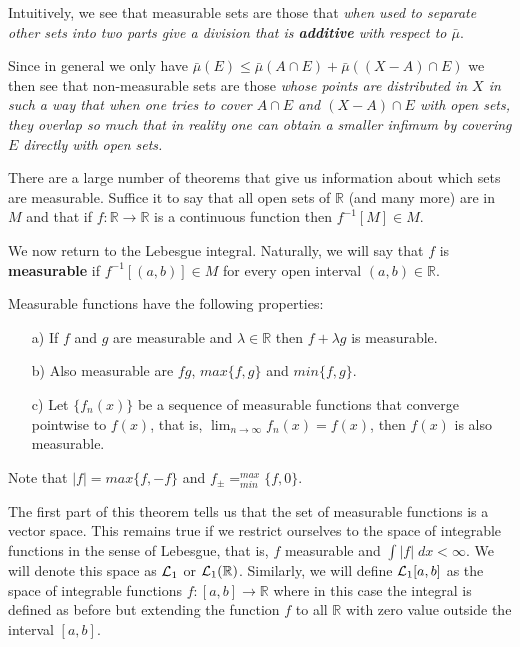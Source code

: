 Intuitively, we see that measurable sets are those that 
{\it when used to separate other sets into two parts give a
division that is {\bf additive} with respect to $\bar{\mu}$}.

Since in general we only have 
$\bar{\mu}(E) \leq \bar{\mu}(A \cap E) + \bar{\mu}((X - A) \cap E)$
we then see that non-measurable sets are those 
{\it whose points are distributed in $X$ in such a way that when
one tries to cover $A \cap E$ and $(X - A) \cap E$ with open sets, they
overlap so much that in reality one can obtain a smaller
infimum by covering $E$ directly with open sets.}

There are a large number of theorems that give us information about
which sets are measurable. Suffice it to say that all
open sets of $\mathbb{R}$ (and many more) are in $M$ and that if 
$f: \mathbb{R} \rightarrow \mathbb{R}$ is a continuous function then 
$f^{-1}[M] \in M$.

We now return to the Lebesgue integral. Naturally, we will say 
that $f$ is {\bf measurable} if $f^{-1}[(a, b)] \in M$ for
every open interval $(a, b) \in \mathbb{R}$. 

\bteo Measurable functions have
the following properties:


\begin{itemize}

\item[a)] If $f$ and $g$ are measurable and $\lambda \in \mathbb{R}$ then
$f + \lambda g$ is measurable.

\item[b)] Also measurable are $fg$, $max\{f, g\}$ and $min\{f, g\}$.


\item[c)] Let $\{f_n(x)\}$ be a sequence of measurable functions that converge
pointwise to $f(x)$, that is, $\lim_{n \to \infty} f_n(x) = f(x)$, then $f(x)$ is also
measurable.
\end{itemize}

\noi Note that $|f| = max\{f, -f\}$ and $f_{\pm} =^{max}_{min}\{f, 0\}$.
\eteo

The first part of this theorem tells us that the set of
measurable functions is a vector space. This remains true 
if we restrict ourselves to the space of integrable functions in the sense
of Lebesgue, that is, $f$ measurable and $\int |f| \; dx < \infty$.
We will denote this space as ${\cal L}_1$ or ${\cal L}_1(\mathbb{R})$. Similarly, we will define
${\cal L}_1[a, b]$ as the space of integrable functions $f: [a, b] \to \mathbb{R}$
where in this case the integral is defined as before but extending
the function $f$ to all $\mathbb{R}$ with zero value outside the interval $[a, b]$.

